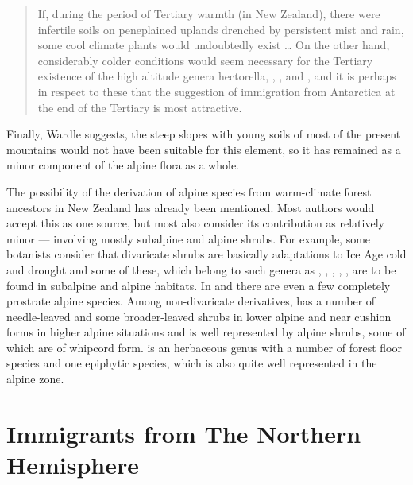 \begin{quote}
	If, during the period of Tertiary warmth (in New Zealand), there were infertile soils on peneplained uplands drenched by persistent mist and rain, some cool climate plants would undoubtedly exist … On the other hand, considerably colder conditions would seem necessary for the Tertiary existence of the high altitude genera hectorella, , ,  and , and it is perhaps in respect to these that the suggestion of immigration from Antarctica at the end of the Tertiary is most attractive.
\end{quote}

Finally, Wardle suggests, the steep slopes with young soils of most of the present mountains would not have been suitable for this element, so it has remained as a minor component of the alpine flora as a whole.

The possibility of the derivation of alpine species from warm-climate forest ancestors in New Zealand has already been mentioned.
Most authors would accept this as one source, but most also consider its contribution as relatively minor — involving mostly subalpine and alpine shrubs.
For example, some botanists consider that divaricate shrubs are basically adaptations to Ice Age cold and drought and some of these, which belong to such genera as , , , , , are to be found in subalpine and alpine habitats.
In  and  there are even a few completely prostrate alpine species.
Among non-divaricate derivatives,  has a number of needle-leaved and some broader-leaved shrubs in lower alpine and near cushion forms in higher alpine situations and  is well represented by alpine shrubs, some of which are of whipcord form.  is an herbaceous genus with a number of forest floor species and one epiphytic species, which is also quite well represented in the alpine zone.

\section{Immigrants from The Northern Hemisphere}

